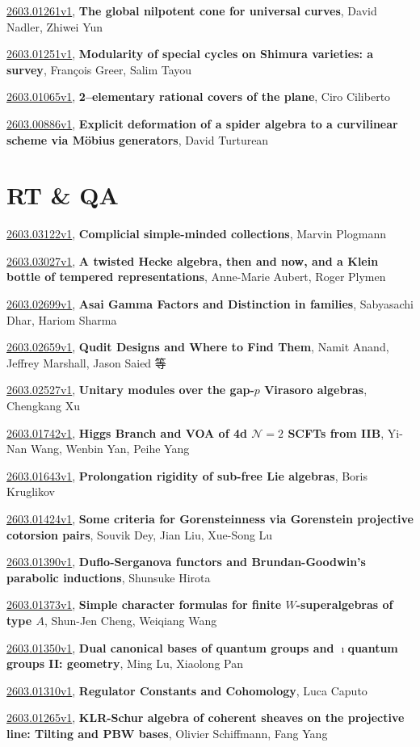 \documentclass[9pt, a4paper]{article}
\theoremstyle{plain}
\theoremstyle{definition}
\theoremstyle{remark}
\newcommand{\arxiv}[3]{\href{https://arxiv.org/abs/#1}{#1}, \textbf{\textcolor{arxivblue}{#2}}, #3}
\begin{document}
\arxiv{2603.01261v1}{The global nilpotent cone for universal curves}{David Nadler, Zhiwei Yun}

\arxiv{2603.01251v1}{Modularity of special cycles on Shimura varieties: a survey}{François Greer, Salim Tayou}

\arxiv{2603.01065v1}{2--elementary rational covers of the plane}{Ciro Ciliberto}

\arxiv{2603.00886v1}{Explicit deformation of a spider algebra to a curvilinear scheme via Möbius generators}{David Turturean}


\section{RT \& QA}
\arxiv{2603.03122v1}{Complicial simple-minded collections}{Marvin Plogmann}

\arxiv{2603.03027v1}{A twisted Hecke algebra, then and now, and a Klein bottle of tempered representations}{Anne-Marie Aubert, Roger Plymen}

\arxiv{2603.02699v1}{Asai Gamma Factors and Distinction in families}{Sabyasachi Dhar, Hariom Sharma}

\arxiv{2603.02659v1}{Qudit Designs and Where to Find Them}{Namit Anand, Jeffrey Marshall, Jason Saied 等}

\arxiv{2603.02527v1}{Unitary modules over the gap-$p$ Virasoro algebras}{Chengkang Xu}

\arxiv{2603.01742v1}{Higgs Branch and VOA of 4d $\mathcal{N}=2$ SCFTs from IIB}{Yi-Nan Wang, Wenbin Yan, Peihe Yang}

\arxiv{2603.01643v1}{Prolongation rigidity of sub-free Lie algebras}{Boris Kruglikov}

\arxiv{2603.01424v1}{Some criteria for Gorensteinness via Gorenstein projective cotorsion pairs}{Souvik Dey, Jian Liu, Xue-Song Lu}

\arxiv{2603.01390v1}{Duflo-Serganova functors and Brundan-Goodwin's parabolic inductions}{Shunsuke Hirota}

\arxiv{2603.01373v1}{Simple character formulas for finite $W$-superalgebras of type $A$}{Shun-Jen Cheng, Weiqiang Wang}

\arxiv{2603.01350v1}{Dual canonical bases of quantum groups and $\imath$quantum groups II: geometry}{Ming Lu, Xiaolong Pan}

\arxiv{2603.01310v1}{Regulator Constants and Cohomology}{Luca Caputo}

\arxiv{2603.01265v1}{KLR-Schur algebra of coherent sheaves on the projective line: Tilting and PBW bases}{Olivier Schiffmann, Fang Yang}
\end{document}
